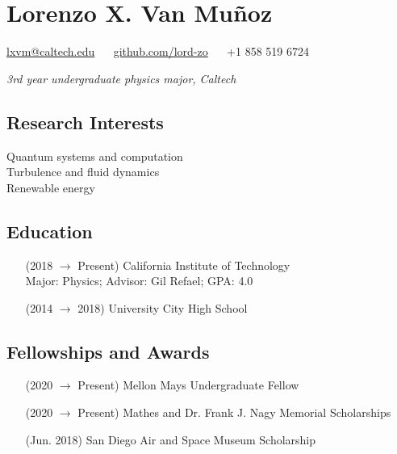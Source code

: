 \documentclass{article}
\begin{document}
{\centering

\section*{Lorenzo X. Van Muñoz}

\href{mailto:lxvm@caltech.edu}{lxvm@caltech.edu}
$\quad$
\href{https://github.com/lord-zo}{github.com/lord-zo}
$\quad$
+1 858 519 6724

\noindent \textit{3rd year undergraduate physics major, Caltech}

}


\begin{multicols}{2}

\subsection*{Research Interests}

\noindent Quantum systems and computation \\
\noindent Turbulence and fluid dynamics \\
\noindent Renewable energy


\subsection*{Education}

\begin{enumerate}
    \item [(2018 $\to$ Present)] California Institute of Technology \\
        Major: Physics; Advisor: Gil Refael; GPA: 4.0
    \item [(2014 $\to$ 2018)] University City High School
\end{enumerate}

\end{multicols}


\subsection*{Fellowships and Awards}

\begin{enumerate}
    \item [(2020 $\to$ Present)] Mellon Mays Undergraduate Fellow
    \item [(2020 $\to$ Present)] Mathes and Dr. Frank J. Nagy Memorial Scholarships
    \item [(Jun. 2018)] San Diego Air and Space Museum Scholarship
\end{enumerate}
\end{document}
